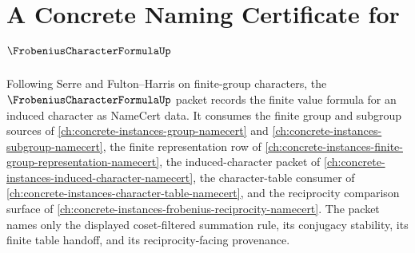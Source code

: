 \chapter{A Concrete Naming Certificate for $\FrobeniusCharacterFormulaUp$}
\label{ch:concrete-instances-frobenius-character-formula-namecert}

Following Serre and Fulton--Harris on finite-group characters, the $\FrobeniusCharacterFormulaUp$ packet records the finite value formula for an induced character as NameCert data. It consumes the finite group and subgroup sources of \autoref{ch:concrete-instances-group-namecert} and \autoref{ch:concrete-instances-subgroup-namecert}, the finite representation row of \autoref{ch:concrete-instances-finite-group-representation-namecert}, the induced-character packet of \autoref{ch:concrete-instances-induced-character-namecert}, the character-table consumer of \autoref{ch:concrete-instances-character-table-namecert}, and the reciprocity comparison surface of \autoref{ch:concrete-instances-frobenius-reciprocity-namecert}. The packet names only the displayed coset-filtered summation rule, its conjugacy stability, its finite table handoff, and its reciprocity-facing provenance.

